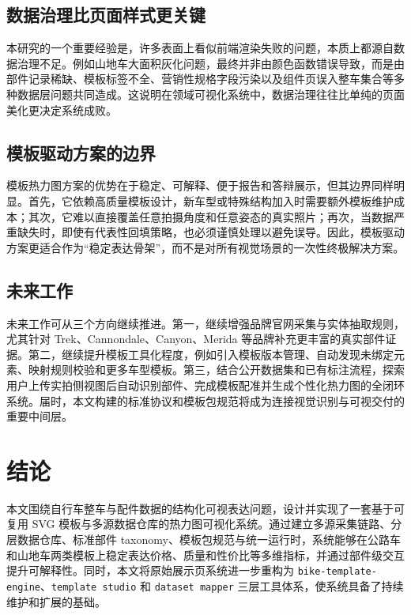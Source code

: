 \documentclass[12pt,hyperref,a4paper,UTF8]{ctexart}
\begin{document}
\subsection{数据治理比页面样式更关键}

本研究的一个重要经验是，许多表面上看似前端渲染失败的问题，本质上都源自数据治理不足。例如山地车大面积灰化问题，最终并非由颜色函数错误导致，而是由部件记录稀缺、模板标签不全、营销性规格字段污染以及组件页误入整车集合等多种数据层问题共同造成。这说明在领域可视化系统中，数据治理往往比单纯的页面美化更决定系统成败。

\subsection{模板驱动方案的边界}

模板热力图方案的优势在于稳定、可解释、便于报告和答辩展示，但其边界同样明显。首先，它依赖高质量模板设计，新车型或特殊结构加入时需要额外模板维护成本；其次，它难以直接覆盖任意拍摄角度和任意姿态的真实照片；再次，当数据严重缺失时，即使有代表性回填策略，也必须谨慎处理以避免误导。因此，模板驱动方案更适合作为“稳定表达骨架”，而不是对所有视觉场景的一次性终极解决方案。

\subsection{未来工作}

未来工作可从三个方向继续推进。第一，继续增强品牌官网采集与实体抽取规则，尤其针对 Trek、Cannondale、Canyon、Merida 等品牌补充更丰富的真实部件证据。第二，继续提升模板工具化程度，例如引入模板版本管理、自动发现未绑定元素、映射规则校验和更多车型模板。第三，结合公开数据集和已有标注流程，探索用户上传实拍侧视图后自动识别部件、完成模板配准并生成个性化热力图的全闭环系统。届时，本文构建的标准协议和模板包规范将成为连接视觉识别与可视交付的重要中间层。

\section{结论}

本文围绕自行车整车与配件数据的结构化可视表达问题，设计并实现了一套基于可复用 SVG 模板与多源数据仓库的热力图可视化系统。通过建立多源采集链路、分层数据仓库、标准部件 taxonomy、模板包规范与统一运行时，系统能够在公路车和山地车两类模板上稳定表达价格、质量和性价比等多维指标，并通过部件级交互提升可解释性。同时，本文将原始展示页系统进一步重构为 \texttt{bike-template-engine}、\texttt{template studio} 和 \texttt{dataset mapper} 三层工具体系，使系统具备了持续维护和扩展的基础。
\end{document}
